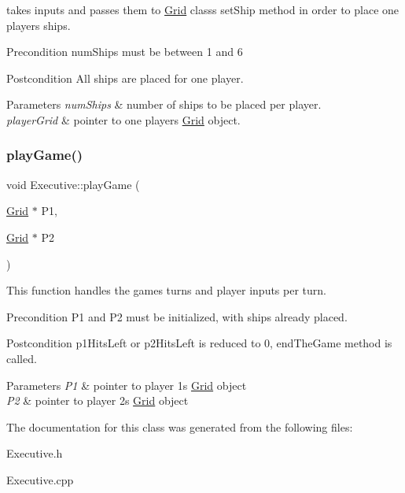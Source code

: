 takes inputs and passes them to \hyperlink{classGrid}{Grid} class\textquotesingle{}s set\+Ship method in order to place one player\textquotesingle{}s ships. 

\begin{DoxyPrecond}{Precondition}
num\+Ships must be between 1 and 6 
\end{DoxyPrecond}
\begin{DoxyPostcond}{Postcondition}
All ships are placed for one player. 
\end{DoxyPostcond}

\begin{DoxyParams}{Parameters}
{\em num\+Ships} & number of ships to be placed per player. \\
\hline
{\em player\+Grid} & pointer to one player\textquotesingle{}s \hyperlink{classGrid}{Grid} object. \\
\hline
\end{DoxyParams}
\mbox{\label{classExecutive_a671bfc107bd1a07b0a6b024778405282}} 
\subsubsection{\texorpdfstring{play\+Game()}{playGame()}}
{\footnotesize\ttfamily void Executive\+::play\+Game (\begin{DoxyParamCaption}\item[{\hyperlink{classGrid}{Grid} $\ast$}]{P1,  }\item[{\hyperlink{classGrid}{Grid} $\ast$}]{P2 }\end{DoxyParamCaption})}



This function handles the game\textquotesingle{}s turns and player inputs per turn. 

\begin{DoxyPrecond}{Precondition}
P1 and P2 must be initialized, with ships already placed. 
\end{DoxyPrecond}
\begin{DoxyPostcond}{Postcondition}
p1\+Hits\+Left or p2\+Hits\+Left is reduced to 0, end\+The\+Game method is called. 
\end{DoxyPostcond}

\begin{DoxyParams}{Parameters}
{\em P1} & pointer to player 1\textquotesingle{}s \hyperlink{classGrid}{Grid} object \\
\hline
{\em P2} & pointer to player 2\textquotesingle{}s \hyperlink{classGrid}{Grid} object \\
\hline
\end{DoxyParams}


The documentation for this class was generated from the following files\+:\begin{DoxyCompactItemize}
\item 
Executive.\+h\item 
Executive.\+cpp\end{DoxyCompactItemize}

